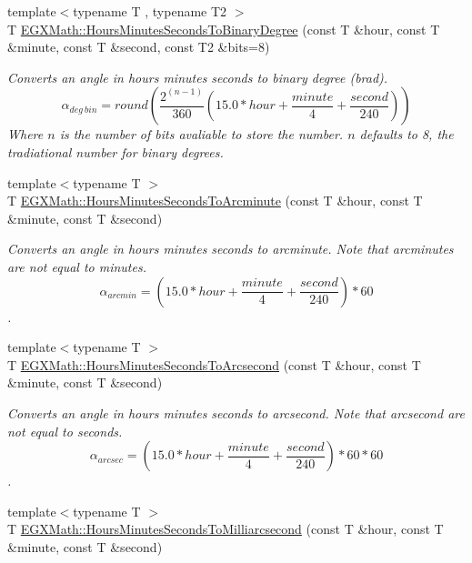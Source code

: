 \begin{DoxyCompactItemize}
{\footnotesize template$<$typename T , typename T2 $>$ }\\T \mbox{\hyperlink{group___e_g_x_math-_angle_conversions-_hours_minutes_seconds_ga962a367fd21f0047eb0a7116a59c2bfc}{E\+G\+X\+Math\+::\+Hours\+Minutes\+Seconds\+To\+Binary\+Degree}} (const T \&hour, const T \&minute, const T \&second, const T2 \&bits=8)
\begin{DoxyCompactList}\small\item\em Converts an angle in hours minutes seconds to binary degree (brad). \[\alpha_{deg\ bin}=round(\frac{2^{(n-1)}}{360}(15.0 * hour + \frac{minute}{4} + \frac{second}{240}))\] Where $n$ is the number of bits avaliable to store the number. $n$ defaults to 8, the tradiational number for binary degrees. \end{DoxyCompactList}\item 
{\footnotesize template$<$typename T $>$ }\\T \mbox{\hyperlink{group___e_g_x_math-_angle_conversions-_hours_minutes_seconds_ga23bfa5abeb014726c2e2ac6303be5dae}{E\+G\+X\+Math\+::\+Hours\+Minutes\+Seconds\+To\+Arcminute}} (const T \&hour, const T \&minute, const T \&second)
\begin{DoxyCompactList}\small\item\em Converts an angle in hours minutes seconds to arcminute. Note that arcminutes are not equal to minutes. \[\alpha_{arcmin}=(15.0 * hour + \frac{minute}{4} + \frac{second}{240}) * 60\]. \end{DoxyCompactList}\item 
{\footnotesize template$<$typename T $>$ }\\T \mbox{\hyperlink{group___e_g_x_math-_angle_conversions-_hours_minutes_seconds_ga14620899c81c1f5e65cde96ef4ee626e}{E\+G\+X\+Math\+::\+Hours\+Minutes\+Seconds\+To\+Arcsecond}} (const T \&hour, const T \&minute, const T \&second)
\begin{DoxyCompactList}\small\item\em Converts an angle in hours minutes seconds to arcsecond. Note that arcsecond are not equal to seconds. \[\alpha_{arcsec}=(15.0 * hour + \frac{minute}{4} + \frac{second}{240}) * 60 * 60\]. \end{DoxyCompactList}\item 
{\footnotesize template$<$typename T $>$ }\\T \mbox{\hyperlink{group___e_g_x_math-_angle_conversions-_hours_minutes_seconds_gaf63c3ba5f75aacd268db2814575fa3f9}{E\+G\+X\+Math\+::\+Hours\+Minutes\+Seconds\+To\+Milliarcsecond}} (const T \&hour, const T \&minute, const T \&second)

\end{DoxyCompactItemize}
